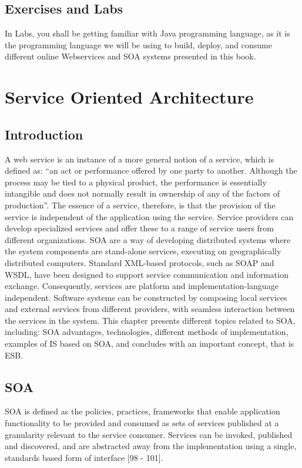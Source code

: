 \documentclass[12pt,a4paper,final,twoside,onecolumn,titlepage]{book}
\begin{document}
\section{Exercises and Labs}
In Labs, you shall be getting familiar with Java programming language, as it is the programming language we will be using to build, deploy, and consume different online Webservices and \gls{SOA} systems presented in this book.

\chapter{Service Oriented Architecture}
\label{SOA}
\section{Introduction}
A web service is an instance of a more general notion of a service, which is defined as:
“an act or performance offered by one party to another. Although the process may be tied to a physical product, the performance is essentially intangible and does not normally result in ownership of any of the factors of production”.
The essence of a service, therefore, is that the provision of the service is independent of the application using the service. Service providers can develop specialized services and offer these to a range of service users from different organizations.
\gls{SOA} are a way of developing distributed systems where the system components are stand-alone services, executing on geographically distributed computers. Standard \gls{XML}-based protocols, such as \gls{SOAP} and \gls{WSDL}, have been designed to support service communication and information exchange. Consequently, services are platform and implementation-language independent. Software systems can be constructed by composing local services and external services from different providers, with seamless interaction between the services in the system.
This chapter presents different topics related to \gls{SOA}, including: \gls{SOA} advantages, technologies, different methods of implementation, examples of \gls{IS} based on \gls{SOA}, and concludes with an important concept, that is \gls{ESB}.

\section{SOA}
\gls{SOA} is defined as the policies, practices, frameworks that enable application functionality to be provided and consumed as sets of services published at a granularity relevant to the service consumer. Services can be invoked, published and discovered, and are abstracted away from the implementation using a single, standards based form of interface [98 - 101]. 
\end{document}
